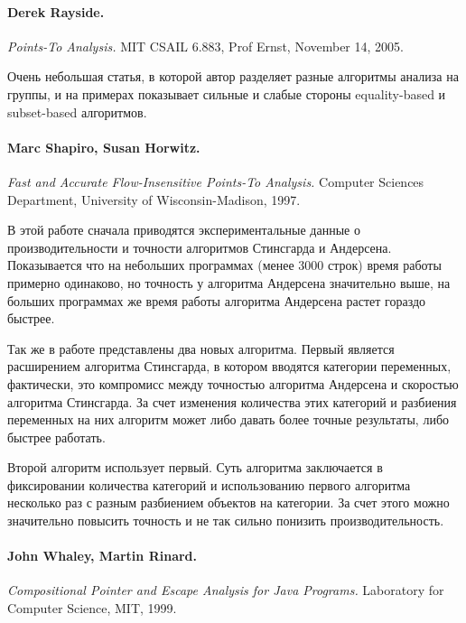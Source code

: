 \documentclass[12pt]{article}
\newcommand{\eng}[1]{{\English#1}}
\begin{document}
    \paragraph{Derek Rayside.}
      \eng{
        \textit{Points-To Analysis.}
        MIT CSAIL 6.883, Prof Ernst,
        November 14, 2005.
      }

      Очень небольшая статья, в которой автор разделяет разные алгоритмы
      анализа на группы, и на примерах показывает сильные и слабые стороны
      \eng{equality-based} и \eng{subset-based} алгоритмов.

    \paragraph{Marc Shapiro, Susan Horwitz.}
      \eng{
        \textit{Fast and Accurate Flow-Insensitive Points-To Analysis.}
        Computer Sciences Department, University of Wisconsin-Madison,
        1997.
      }

      В этой работе сначала приводятся экспериментальные данные о
      производительности и точности алгоритмов Стинсгарда и Андерсена.
      Показывается что на небольших программах (менее 3000 строк) время работы
      примерно одинаково, но точность у алгоритма Андерсена значительно выше,
      на больших программах же время работы алгоритма Андерсена растет гораздо
      быстрее.

      Так же в работе представлены два новых алгоритма.  Первый является
      расширением алгоритма Стинсгарда, в котором вводятся категории
      переменных, фактически, это компромисс между
      точностью алгоритма Андерсена и скоростью алгоритма Стинсгарда.
      За счет изменения количества этих категорий и разбиения переменных
      на них алгоритм может либо давать более точные результаты, либо быстрее
      работать.

      Второй алгоритм использует первый. Суть алгоритма заключается в
      фиксировании количества категорий и использованию первого алгоритма
      несколько раз с разным разбиением объектов на категории. За счет этого
      можно значительно повысить точность и не так сильно понизить
      производительность.

    \paragraph{John Whaley, Martin Rinard.}
      \eng{
        \textit{Compositional Pointer and Escape Analysis for Java Programs.}
        Laboratory for Computer Science, MIT,
        1999.
      }
\end{document}
